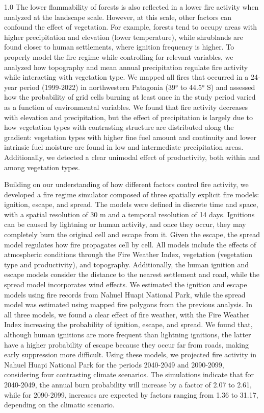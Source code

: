 \begin{spacing}{1.0}
The lower flammability of forests is also reflected in a lower fire activity when analyzed at the landscape scale. However, at this scale, other factors can confound the effect of vegetation. For example, forests tend to occupy areas with higher precipitation and elevation (lower temperature), while shrublands are found closer to human settlements, where ignition frequency is higher. To properly model the fire regime while controlling for relevant variables, we analyzed how topography and mean annual precipitation regulate fire activity while interacting with vegetation type. We mapped all fires that occurred in a 24-year period (1999-2022) in northwestern Patagonia (39° to 44.5° S) and assessed how the probability of grid cells burning at least once in the study period varied as a function of environmental variables. We found that fire activity decreases with elevation and precipitation, but the effect of precipitation is largely due to how vegetation types with contrasting structure are distributed along the gradient: vegetation types with higher fine fuel amount and continuity and lower intrinsic fuel moisture are found in low and intermediate precipitation areas. Additionally, we detected a clear unimodal effect of productivity, both within and among vegetation types.

Building on our understanding of how different factors control fire activity, we developed a fire regime simulator composed of three spatially explicit fire models: ignition, escape, and spread. The models were defined in discrete time and space, with a spatial resolution of 30 m and a temporal resolution of 14 days. Ignitions can be caused by lightning or human activity, and once they occur, they may completely burn the original cell and escape from it. Given the escape, the spread model regulates how fire propagates cell by cell. All models include the effects of atmospheric conditions through the Fire Weather Index, vegetation (vegetation type and productivity), and topography. Additionally, the human ignition and escape models consider the distance to the nearest settlement and road, while the spread model incorporates wind effects. We estimated the ignition and escape models using fire records from Nahuel Huapi National Park, while the spread model was estimated using mapped fire polygons from the previous analysis. In all three models, we found a clear effect of fire weather, with the Fire Weather Index increasing the probability of ignition, escape, and spread. We found that, although human ignitions are more frequent than lightning ignitions, the latter have a higher probability of escape because they occur far from roads, making early suppression more difficult. Using these models, we projected fire activity in Nahuel Huapi National Park for the periods 2040-2049 and 2090-2099, considering four contrasting climate scenarios. The simulations indicate that for 2040-2049, the annual burn probability will increase by a factor of 2.07 to 2.61, while for 2090-2099, increases are expected by factors ranging from 1.36 to 31.17, depending on the climatic scenario.


\end{spacing}
